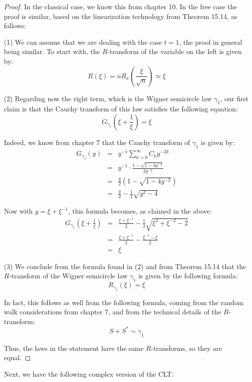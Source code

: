 \documentclass[12pt]{amsbook}
\begin{document}
\begin{proof}
In the classical case, we know this from chapter 10. In the free case the proof is similar, based on the linearization technology from Theorem 15.14, as follows:

\medskip

(1) We can assume that we are dealing with the case $t=1$, the proof in general being similar. To start with, the $R$-transform of the variable on the left is given by:
$$R(\xi)
=nR_x\left(\frac{\xi}{\sqrt{n}}\right)
\simeq\xi$$

(2) Regarding now the right term, which is the Wigner semicircle law $\gamma_1$, our first claim is that the Cauchy transform of this law satisfies the following equation:
$$G_{\gamma_1}\left(\xi+\frac{1}{\xi}\right)=\xi$$

Indeed, we know from chapter 7 that the Cauchy transform of $\gamma_1$ is given by:
\begin{eqnarray*}
G_{\gamma_1}(y)
&=&y^{-1}\sum_{k=0}^\infty C_ky^{-2k}\\
&=&y^{-1}\cdot\frac{1-\sqrt{1-4y^{-2}}}{2y^{-2}}\\
&=&\frac{y}{2}\left(1-\sqrt{1-4y^{-2}}\right)\\
&=&\frac{y}{2}-\frac{1}{2}\sqrt{y^2-4}
\end{eqnarray*}

Now with $y=\xi+\xi^{-1}$, this formula becomes, as claimed in the above:
\begin{eqnarray*}
G_{\gamma_1}\left(\xi+\frac{1}{\xi}\right)
&=&\frac{\xi+\xi^{-1}}{2}-\frac{1}{2}\sqrt{\xi^2+\xi^{-2}-2}\\
&=&\frac{\xi+\xi^{-1}}{2}-\frac{\xi^{-1}-\xi}{2}\\
&=&\xi
\end{eqnarray*}

(3) We conclude from the formula found in (2) and from Theorem 15.14 that the $R$-transform of the Wigner semicircle law $\gamma_1$ is given by the following formula:
$$R_{\gamma_1}(\xi)=\xi$$

In fact, this follows as well from the following formula, coming from the random walk considerations from chapter 7, and from the technical details of the $R$-transform:
$$S+S^*\sim\gamma_1$$

Thus, the laws in the statement have the same $R$-transforms, so they are equal.
\end{proof}

Next, we have the following complex version of the CLT:
\end{document}
